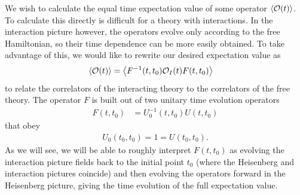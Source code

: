 We wish to calculate the equal time expectation value of some operator $\left<\mathcal{O}(t)\right>$.
To calculate this directly is difficult for a theory with interactions.
In the interaction picture however, the operators evolve only according to the
free Hamiltonian, so their time dependence can be more easily obtained. To take advantage of this,
we would like to rewrite our desired expectation value as
\begin{align}
    \left<\mathcal{O}(t)\right> &= \left<F^{-1}(t,t_0)\mathcal{O}_I(t) F(t,t_0)\right>\label{heis_to_int}
\end{align}
to relate the correlators of the interacting theory to the correlators of the
free theory.
The operator $F$ is built out of two unitary time evolution operators
\begin{align}
    F(t,t_0) &= U_0^{-1}(t,t_0)U(t,t_0)\label{f_def}
\end{align}
that obey
\begin{align}
    U_0(t_0,t_0) = 1 = U(t_0,t_0).
\end{align}
As we will see, we will be able to roughly interpret $F(t,t_0)$ as evolving the interaction picture fields
back to the initial point $t_0$ (where the Heisenberg and interaction pictures coincide) and then
evolving the operators forward in the Heisenberg picture, giving the time evolution
of the full expectation value.


